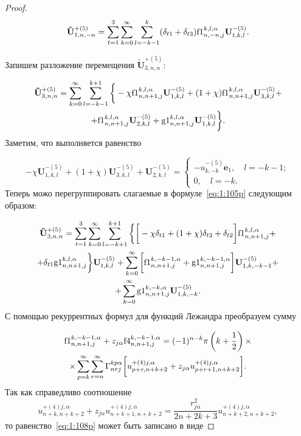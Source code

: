 \begin{proof}
\begin{equation}
\mathbf{\tilde U}_{1,n,-n}^{+(5)}=\sum\limits_{t=1}^3\sum\limits_{k=0}^\infty\sum\limits_{l=-k-1}^{k}(\delta_{t1}+\delta_{t3}){\rm f1}_{n,-n,j}^{k,l,\alpha}\mathbf{U}_{t,k,l}^{-(5)}.
\label{eq:1:104p}
\end{equation}

Запишем разложение перемещения $\mathbf{\tilde U}_{3,n,n}^{+(5)}$:

\begin{multline}\label{eq:1:105p}
\mathbf{\tilde U}_{3,n,n}^{+(5)}=\sum\limits_{k=0}^\infty\sum\limits_{l=-k-1}^{k+1}\bigg\{-\chi{\rm f1}_{n,n+1,j}^{k,l,\alpha}\mathbf{U}_{1,k,l}^{-(5)}+(1+\chi){\rm f1}_{n,n+1,j}^{k,l,\alpha}\mathbf{U}_{3,k,l}^{-(5)}+ \\
+{\rm f1}_{n,n+1,j}^{k,l,\alpha}\mathbf{U}_{2,k,l}^{-(5)}+{\rm g1}_{n,n+1,j}^{k,l,\alpha}\mathbf{U}_{1,k,l}^{-(5)}\bigg\}.
\end{multline}
Заметим, что выполняется равенство

\begin{equation}
-\chi\mathbf{U}_{1,k,l}^{-(5)}+(1+\chi)\mathbf{U}_{3,k,l}^{-(5)}+\mathbf{U}_{2,k,l}^{-(5)}=
\begin{cases}
-u_{k,-k}^{-(5)}\mathbf{e}_1,\quad l=-k-1; \\
0,\quad l=-k.
\end{cases}
\label{eq:1:106p}
\end{equation}
Теперь можо перегруппировать слагаемые в формуле~\eqref{eq:1:105p} следующим образом:

\begin{multline}\label{eq:1:107p}
\mathbf{\tilde U}_{3,n,n}^{+(5)}=\sum\limits_{t=1}^3\sum\limits_{k=0}^\infty\sum\limits_{l=-k+1}^{k+1}\bigg\{\bigg\lbrack-\chi\delta_{t1}+(1+\chi)\delta_{t3}+\delta_{t2}\bigg\rbrack{\rm f1}_{n,n+1,j}^{k,l,\alpha}+ \\
+\delta_{t1}{\rm g1}_{n,n+1,j}^{k,l,\alpha}\bigg\}\mathbf{U}_{t,k,l}^{-(5)}+\sum\limits_{k=0}^\infty\bigg\lbrack{\rm f1}_{n,n+1,j}^{k,-k-1,\alpha}+{\rm g1}_{n,n+1,j}^{k,-k-1,\alpha}\bigg\rbrack\mathbf{U}_{1,k,-k-1}^{-(5)}+ \\
+\sum\limits_{k=0}^\infty{\rm g1}_{n,n+1,j}^{k,-k,\alpha}\mathbf{U}_{1,k,-k}^{-(5)}.
\end{multline}
С помощью рекуррентных формул для функций Лежандра преобразуем сумму

\begin{multline}
{\rm f1}_{n,n+1,j}^{k,-k-1,\alpha}+z_{j\alpha}{\rm f4}_{n,n+1,j}^{k,-k-1,\alpha}=(-1)^{n-k}\pi \left( {k + \frac{1}{2}} \right)\times \\
\times\sum\limits_{p = k}^\infty  \sum\limits_{r = n}^\infty\Gamma _{nrj}^{kp\alpha }\bigg\lbrack{u}_{p+r,n+k+2}^{+(4)j,\alpha}+z_{j\alpha}{u}_{p+r+1,n+k+2}^{ + (4)j,\alpha}\bigg\rbrack.
\label{eq:1:108p}
\end{multline}
Так как справедливо соотношение
$$
{u}_{n+k,n+k+2}^{ + (4)j,\alpha}+z_{j\alpha}{u}_{n+k+1,n+k+2}^{+(4)j,\alpha}=\frac{r_{j\alpha}^2}{2n+2k+3}u_{n+k+2,n+k+2}^{+(4)j,\alpha},
$$
то равенство~\eqref{eq:1:108p} может быть записано в виде


\end{proof}
